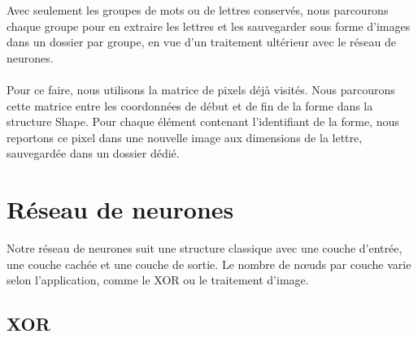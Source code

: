 \documentclass{article}
\begin{document}
Avec seulement les groupes de mots ou de lettres conservés, nous parcourons chaque groupe pour en extraire les lettres et les sauvegarder sous forme d'images dans un dossier par groupe, en vue d’un traitement ultérieur avec le réseau de neurones.
\\\\
Pour ce faire, nous utilisons la matrice de pixels déjà visités. Nous parcourons cette matrice entre les coordonnées de début et de fin de la forme dans la structure Shape. Pour chaque élément contenant l'identifiant de la forme, nous reportons ce pixel dans une nouvelle image aux dimensions de la lettre, sauvegardée dans un dossier dédié.
\newpage
\section{Réseau de neurones}

Notre réseau de neurones suit une structure classique avec une couche d’entrée, une couche cachée et une couche de sortie. Le nombre de nœuds par couche varie selon l'application, comme le XOR ou le traitement d'image.

\subsection{XOR}
\end{document}
